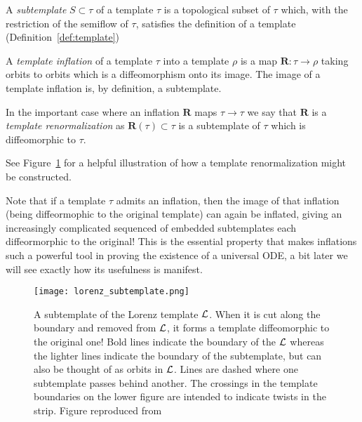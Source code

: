 \documentclass[paper.tex]{subfiles}
\begin{document}



\begin{definition}[Subtemplate]
  A \emph{subtemplate} $S \subset \tau$ of a template $\tau$ is a topological subset of $\tau$ which, with the restriction of the semiflow of $\tau$, satisfies the definition of a template (Definition~\ref{def:template})
\end{definition}


\begin{definition}
  A  \emph{template inflation} of a template $\tau$ into a template $\rho$ is a map $\bm{R} : \tau \to \rho$ taking orbits to orbits which is a diffeomorphism onto its image.
  The image of a template inflation is, by definition, a subtemplate.
\end{definition}


\begin{definition}
  In the important case where an inflation $\bm{R}$ maps $\tau \to \tau$ we say that $\bm{R}$ is a \emph{template renormalization} as $\bm{R}(\tau) \subset \tau$ is a subtemplate of $\tau$ which
  is diffeomorphic to $\tau$.
\end{definition}


See Figure~\ref{fig:lorenz_subtemplate} for a helpful illustration of how a template renormalization might be constructed.


Note that if a template $\tau$ admits an inflation, then the image of that inflation (being diffeormophic to the original template) can again be inflated, giving an increasingly complicated sequenced of embedded
subtemplates each diffeormorphic to the original! This is the essential property that makes inflations such a powerful tool in proving the existence of a universal ODE, a bit later
we will see exactly how its usefulness is manifest.

\begin{figure}[h]
  \centering
  \texttt{[image: lorenz\_subtemplate.png]}
  \caption{A subtemplate of the Lorenz template $\mathcal{L}$. When it is cut along the boundary and removed from $\mathcal{L}$, it forms a template diffeomorphic to the original one!
    Bold lines indicate the boundary of the $\mathcal{L}$ whereas the lighter lines indicate the boundary of the subtemplate, but can also be thought of as orbits in $\mathcal{L}$.
    Lines are dashed where one subtemplate passes behind another. The crossings in the template boundaries on the lower figure
    are intended to indicate twists in the strip.
    Figure reproduced from~\cite{knottyode}}\label{fig:lorenz_subtemplate}
\end{figure}
\end{document}
